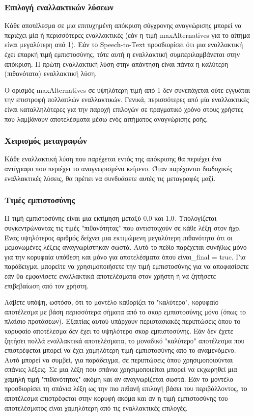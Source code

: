 \documentclass[oneside, 12pt]{book}
\begin{document}
\subsubsection{Επιλογή εναλλακτικών λύσεων}
Κάθε αποτέλεσμα σε μια επιτυχημένη απόκριση σύγχρονης αναγνώρισης μπορεί να περιέχει μία ή περισσότερες εναλλακτικές (εάν η τιμή maxAlternatives για το αίτημα είναι μεγαλύτερη από 1). Εάν το Speech-to-Text προσδιορίσει ότι μια εναλλακτική έχει επαρκή τιμή εμπιστοσύνης, τότε αυτή η εναλλακτική συμπεριλαμβάνεται στην απόκριση. Η πρώτη εναλλακτική λύση στην απάντηση είναι πάντα η καλύτερη (πιθανότατα) εναλλακτική λύση.

Ο ορισμός maxAlternatives σε υψηλότερη τιμή από 1 δεν συνεπάγεται ούτε εγγυάται την επιστροφή πολλαπλών εναλλακτικών. Γενικά, περισσότερες από μία εναλλακτικές είναι καταλληλότερες για την παροχή επιλογών σε πραγματικό χρόνο στους χρήστες που λαμβάνουν αποτελέσματα μέσω ενός αιτήματος αναγνώρισης ροής.
\subsubsection{Χειρισμός μεταγραφών}
Κάθε εναλλακτική λύση που παρέχεται εντός της απόκρισης θα περιέχει ένα αντίγραφο που περιέχει το αναγνωρισμένο κείμενο. Όταν παρέχονται διαδοχικές εναλλακτικές λύσεις, θα πρέπει να συνδυάσετε αυτές τις μεταγραφές μαζί.
\subsubsection{Τιμές εμπιστοσύνης}
Η τιμή εμπιστοσύνης είναι μια εκτίμηση μεταξύ 0,0 και 1,0. Υπολογίζεται συγκεντρώνοντας τις τιμές "πιθανότητας" που αντιστοιχούν σε κάθε λέξη στον ήχο. Ένας υψηλότερος αριθμός δείχνει μια εκτιμώμενη μεγαλύτερη πιθανότητα ότι οι μεμονωμένες λέξεις αναγνωρίστηκαν σωστά. Αυτό το πεδίο παρέχεται συνήθως μόνο για την κορυφαία υπόθεση και μόνο για αποτελέσματα όπου είναι_final = true. Για παράδειγμα, μπορείτε να χρησιμοποιήσετε την τιμή εμπιστοσύνης για να αποφασίσετε εάν θα εμφανίσετε εναλλακτικά αποτελέσματα στον χρήστη ή να ζητήσετε επιβεβαίωση από τον χρήστη.

Λάβετε υπόψη, ωστόσο, ότι το μοντέλο καθορίζει το "καλύτερο", κορυφαίο αποτέλεσμα με βάση περισσότερα σήματα από το σκορ εμπιστοσύνης μόνο (όπως το πλαίσιο προτάσεων). Εξαιτίας αυτού υπάρχουν περιστασιακές περιπτώσεις όπου το κορυφαίο αποτέλεσμα δεν έχει το υψηλότερο σκορ εμπιστοσύνης. Εάν δεν έχετε ζητήσει πολλά εναλλακτικά αποτελέσματα, το μοναδικό "καλύτερο" αποτέλεσμα που επιστρέφεται μπορεί να έχει χαμηλότερη τιμή εμπιστοσύνης από το αναμενόμενο. Αυτό μπορεί να συμβεί, για παράδειγμα, σε περιπτώσεις όπου χρησιμοποιούνται σπάνιες λέξεις. Σε μια λέξη που σπάνια χρησιμοποιείται μπορεί να εκχωρηθεί μια χαμηλή τιμή "πιθανότητας" ακόμη και αν αναγνωρίζεται σωστά. Εάν το μοντέλο προσδιορίσει τη σπάνια λέξη ως την πιο πιθανή επιλογή βάσει του περιβάλλοντος, το αποτέλεσμα επιστρέφεται στην κορυφή ακόμα και αν η τιμή εμπιστοσύνης του αποτελέσματος είναι χαμηλότερη από τις εναλλακτικές επιλογές.
\end{document}
